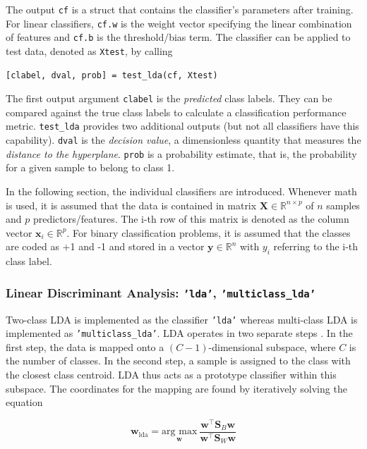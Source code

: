\documentclass[utf8]{frontiersSCNS} %
\newcommand{\w}{\mathbf{w}}
\newcommand{\x}{\mathbf{x}}
\newcommand{\R}{\mathbb{R}}
\renewcommand{\S}{\mathbf{S}}
\newcommand{\X}{\mathbf{X}}
\newcommand{\ttt}[1]{\texttt{#1}}
\begin{document}
The output \ttt{cf} is a struct that contains the classifier's parameters after training. For linear classifiers, \ttt{cf.w} is the weight vector specifying the linear combination of features and \ttt{cf.b} is the threshold/bias term. The classifier can be applied to test data, denoted as \ttt{Xtest}, by calling

\begin{verbatim}
[clabel, dval, prob] = test_lda(cf, Xtest)
\end{verbatim}

The first output argument \ttt{clabel} is the \textit{predicted} class labels. They can be compared against the true class labels to calculate a classification performance metric. \ttt{test\_lda} provides two additional outputs (but not all classifiers have this capability). \ttt{dval} is the \textit{decision value}, a dimensionless quantity that measures the \textit{distance to the hyperplane}. \ttt{prob} is a probability estimate, that is, the probability for a given sample to belong to class 1. 

In the following section, the individual classifiers are introduced. Whenever math is used, it is assumed that the data is contained in matrix $\X\in\R^{n \times p}$ of $n$ samples and $p$ predictors/features. The i-th row of this matrix is denoted as the column vector $\x_i\in\R^p$. For binary classification problems, it is assumed that the classes are coded as +1 and -1 and stored in a vector $\mathbf{y}\in\R^n$ with $y_i$ referring to the i-th class label.

\subsubsection{Linear Discriminant Analysis: \ttt{'lda'}, \ttt{'multiclass\_lda'}}

Two-class LDA is implemented as the classifier \ttt{'lda'} whereas multi-class LDA is implemented as \texttt{'multiclass\_lda'}. LDA operates in two separate steps \citep{Fisher1936}. In the first step, the data is mapped onto a $(C-1)$-dimensional subspace, where $C$ is the number of classes. In the second step, a sample is assigned to the class with the closest class centroid. LDA thus acts as a prototype classifier within this subspace. The coordinates for the mapping are found by iteratively solving the equation

\begin{equation}
\label{eq:fda}
\w_{\text{lda}} = \underset{\w}{\text{arg max}}\ \frac{\w^\top \S_B\w}{\w^\top \S_W\w}
\end{equation}
\end{document}
